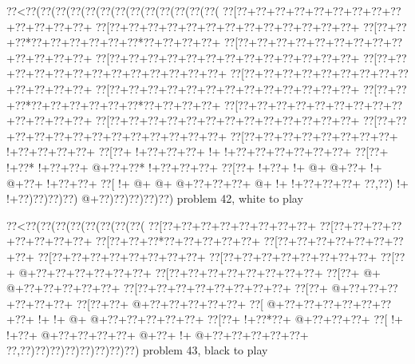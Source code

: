 \vbox{\vbox{\goo
\0??<\0??(\0??(\0??(\0??(\0??(\0??(\0??(\0??(\0??(\0??(\0??(\0??(\0??(
\0??[\0??+\0??+\0??+\0??+\0??+\0??+\0??+\0??+\0??+\0??+\0??+\0??+\0??+
\0??[\0??+\0??+\0??+\0??+\0??+\0??+\0??+\0??+\0??+\0??+\0??+\0??+\0??+
\0??[\0??+\0??+\0??*\0??+\0??+\0??+\0??+\0??+\0??*\0??+\0??+\0??+\0??+
\0??[\0??+\0??+\0??+\0??+\0??+\0??+\0??+\0??+\0??+\0??+\0??+\0??+\0??+
\0??[\0??+\0??+\0??+\0??+\0??+\0??+\0??+\0??+\0??+\0??+\0??+\0??+\0??+
\0??[\0??+\0??+\0??+\0??+\0??+\0??+\0??+\0??+\0??+\0??+\0??+\0??+\0??+
\0??[\0??+\0??+\0??+\0??+\0??+\0??+\0??+\0??+\0??+\0??+\0??+\0??+\0??+
\0??[\0??+\0??+\0??+\0??+\0??+\0??+\0??+\0??+\0??+\0??+\0??+\0??+\0??+
\0??[\0??+\0??+\0??*\0??+\0??+\0??+\0??+\0??+\0??*\0??+\0??+\0??+\0??+
\0??[\0??+\0??+\0??+\0??+\0??+\0??+\0??+\0??+\0??+\0??+\0??+\0??+\0??+
\0??[\0??+\0??+\0??+\0??+\0??+\0??+\0??+\0??+\0??+\0??+\0??+\0??+\0??+
\0??[\0??+\0??+\0??+\0??+\0??+\0??+\0??+\0??+\0??+\0??+\0??+\0??+\0??+
\0??[\0??+\0??+\0??+\0??+\0??+\0??+\0??+\0??+\- !+\0??+\0??+\0??+\0??+
\0??[\0??+\- !+\0??+\0??+\0??+\- !+\- !+\0??+\0??+\0??+\0??+\0??+\0??+
\0??[\0??+\- !+\0??*\- !+\0??+\0??+\- @+\0??+\0??*\- !+\0??+\0??+\0??+
\0??[\0??+\- !+\0??+\- !+\- @+\- @+\0??+\- !+\- @+\0??+\- !+\0??+\0??+
\0??[\- !+\- @+\- @+\- @+\0??+\0??+\0??+\- @+\- !+\- !+\0??+\0??+\0??+
\0??,\0??)\- !+\- !+\0??)\0??)\0??)\0??)\- @+\0??)\0??)\0??)\0??)\0??)
}
\hfil problem 42, white to play\hfil\break
}

\vbox{\vbox{\goo
\0??<\0??(\0??(\0??(\0??(\0??(\0??(\0??(\0??(
\0??[\0??+\0??+\0??+\0??+\0??+\0??+\0??+\0??+
\0??[\0??+\0??+\0??+\0??+\0??+\0??+\0??+\0??+
\0??[\0??+\0??+\0??*\0??+\0??+\0??+\0??+\0??+
\0??[\0??+\0??+\0??+\0??+\0??+\0??+\0??+\0??+
\0??[\0??+\0??+\0??+\0??+\0??+\0??+\0??+\0??+
\0??[\0??+\0??+\0??+\0??+\0??+\0??+\0??+\0??+
\0??[\0??+\- @+\0??+\0??+\0??+\0??+\0??+\0??+
\0??[\0??+\0??+\0??+\0??+\0??+\0??+\0??+\0??+
\0??[\0??+\- @+\- @+\0??+\0??+\0??+\0??+\0??+
\0??[\0??+\0??+\0??+\0??+\0??+\0??+\0??+\0??+
\0??[\0??+\- @+\0??+\0??+\0??+\0??+\0??+\0??+
\0??[\0??+\0??+\- @+\0??+\0??+\0??+\0??+\0??+
\0??[\- @+\0??+\0??+\0??+\0??+\0??+\0??+\0??+
\- !+\- !+\- @+\- @+\0??+\0??+\0??+\0??+\0??+
\0??[\0??+\- !+\0??*\0??+\- @+\0??+\0??+\0??+
\0??[\- !+\- !+\0??+\- @+\0??+\0??+\0??+\0??+
\- @+\0??+\- !+\- @+\0??+\0??+\0??+\0??+\0??+
\0??,\0??)\0??)\0??)\0??)\0??)\0??)\0??)\0??)
}
\hfil problem 43, black to play\hfil\break
}

